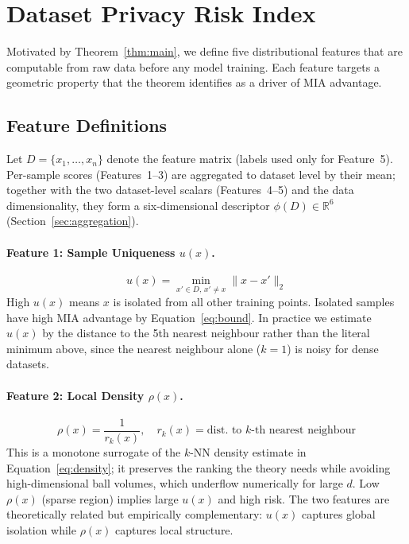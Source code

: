 \section{Dataset Privacy Risk Index}
\label{sec:dpri}

Motivated by Theorem~\ref{thm:main}, we define five distributional
features that are computable from raw data before any model training.
Each feature targets a geometric property that the theorem identifies as
a driver of MIA advantage.

\subsection{Feature Definitions}

Let $D = \{x_1,\dots,x_n\}$ denote the feature matrix (labels used only
for Feature~5).
Per-sample scores (Features~1--3) are aggregated to dataset level by their
mean; together with the two dataset-level scalars (Features~4--5) and the
data dimensionality, they form a six-dimensional descriptor
$\phi(D) \in \mathbb{R}^{6}$ (Section~\ref{sec:aggregation}).

\paragraph{Feature 1: Sample Uniqueness $u(x)$.}
\begin{equation}
  u(x) = \min_{x' \in D,\, x'\neq x} \|x - x'\|_2
\end{equation}
High $u(x)$ means $x$ is isolated from all other training points.
Isolated samples have high MIA advantage by Equation~\eqref{eq:bound}.
In practice we estimate $u(x)$ by the distance to the 5th nearest
neighbour rather than the literal minimum above, since the nearest
neighbour alone ($k=1$) is noisy for dense datasets.

\paragraph{Feature 2: Local Density $\rho(x)$.}
\begin{equation}
  \rho(x) = \frac{1}{r_k(x)}, \quad
  r_k(x) = \text{dist.\ to $k$-th nearest neighbour}
\end{equation}
This is a monotone surrogate of the $k$-NN density estimate in
Equation~\eqref{eq:density}; it preserves the ranking the theory needs
while avoiding high-dimensional ball volumes, which underflow numerically
for large $d$.
Low $\rho(x)$ (sparse region) implies large $u(x)$ and high risk.
The two features are theoretically related but empirically complementary:
$u(x)$ captures global isolation while $\rho(x)$ captures local structure.

